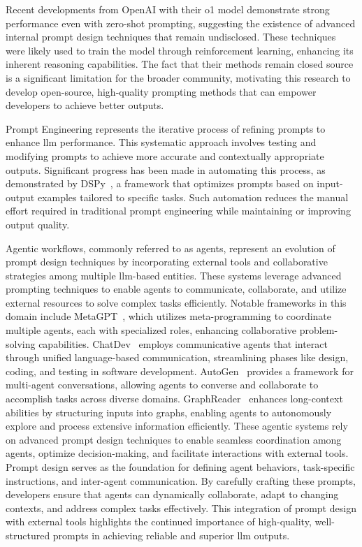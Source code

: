 \documentclass[12pt,twoside,english]{article}
\begin{document}
Recent developments from OpenAI with their o1 model demonstrate strong performance even with zero-shot prompting, suggesting the existence of advanced internal prompt design techniques that remain undisclosed. These techniques were likely used to train the model through reinforcement learning, enhancing its inherent reasoning capabilities. The fact that their methods remain closed source is a significant limitation for the broader community, motivating this research to develop open-source, high-quality prompting methods that can empower developers to achieve better outputs.

Prompt Engineering represents the iterative process of refining prompts to enhance \gls{llm} performance. This systematic approach involves testing and modifying prompts to achieve more accurate and contextually appropriate outputs. Significant progress has been made in automating this process, as demonstrated by DSPy~\cite{khattab2023dspycompilingdeclarativelanguage}, a framework that optimizes prompts based on input-output examples tailored to specific tasks. Such automation reduces the manual effort required in traditional prompt engineering while maintaining or improving output quality.

Agentic workflows, commonly referred to as agents, represent an evolution of prompt design techniques by incorporating external tools and collaborative strategies among multiple \gls{llm}-based entities. These systems leverage advanced prompting techniques to enable agents to communicate, collaborate, and utilize external resources to solve complex tasks efficiently. Notable frameworks in this domain include MetaGPT~\cite{hong2024metagptmetaprogrammingmultiagent}, which utilizes meta-programming to coordinate multiple agents, each with specialized roles, enhancing collaborative problem-solving capabilities. ChatDev~\cite{qian2024chatdevcommunicativeagentssoftware} employs communicative agents that interact through unified language-based communication, streamlining phases like design, coding, and testing in software development. AutoGen~\cite{wu2023autogenenablingnextgenllm} provides a framework for multi-agent conversations, allowing agents to converse and collaborate to accomplish tasks across diverse domains. GraphReader~\cite{li2024graphreaderbuildinggraphbasedagent} enhances long-context abilities by structuring inputs into graphs, enabling agents to autonomously explore and process extensive information efficiently. 
\newpage
These agentic systems rely on advanced prompt design techniques to enable seamless coordination among agents, optimize decision-making, and facilitate interactions with external tools. Prompt design serves as the foundation for defining agent behaviors, task-specific instructions, and inter-agent communication. By carefully crafting these prompts, developers ensure that agents can dynamically collaborate, adapt to changing contexts, and address complex tasks effectively. This integration of prompt design with external tools highlights the continued importance of high-quality, well-structured prompts in achieving reliable and superior \gls{llm} outputs.\\
\end{document}
